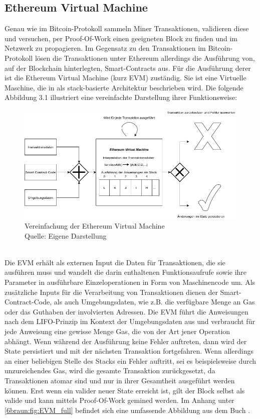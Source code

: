\subsection{Ethereum Virtual Machine}
Genau wie im Bitcoin-Protokoll sammeln Miner Transaktionen, validieren diese und versuchen, per Proof-Of-Work einen geeigneten Block zu finden und im Netzwerk zu propagieren. 
Im Gegensatz zu den Transaktionen im Bitcoin-Protokoll lösen die Transaktionen unter Ethereum allerdings die Ausführung von, auf der Blockchain hinterlegten, Smart-Contracts aus. 
Für die Ausführung derer ist die Ethereum Virtual Machine (kurz EVM) zuständig. 
Sie ist eine Virtuelle Maschine, die in  \cite{wood_yellowpaper_2014} als stack-basierte Architektur beschrieben wird. 
Die folgende Abbildung 3.1 illustriert eine vereinfachte Darstellung ihrer Funktionsweise: 
\begin{figure}[htpb]
	\centering
	\includegraphics[width=\textwidth]{images/evm_simple.png}
	\caption{Vereinfachung der Ethereum Virtual Machine\\
	Quelle: Eigene Darstellung}
	\label{6braun:fig:evm_simple}
\end{figure}\\

Die EVM erhält als externen Input die Daten für Transaktionen, die sie ausführen muss und wandelt die darin enthaltenen Funktionsaufrufe sowie ihre Parameter in ausführbare Einzeloperationen in Form von Maschinencode um. 
Als zusätzliche Inputs für die Verarbeitung von Transaktionen dienen der Smart-Contract-Code, als auch Umgebungsdaten, wie z.B. die verfügbare Menge an Gas oder das Guthaben der involvierten Adressen. 
Die EVM führt die Anweisungen nach dem LIFO-Prinzip im Kontext der Umgebungsdaten aus und verbraucht für jede Anweisung eine gewisse Menge Gas, die von der Art jener Operation abhängt. Wenn während der Ausführung keine Fehler auftreten, dann wird der State persistiert und mit der nächsten Transaktion fortgefahren. 
Wenn allerdings an einer beliebigen Stelle des Stacks ein Fehler auftritt, sei es beispielsweise durch unzureichendes Gas, wird die gesamte Transaktion zurückgesetzt, da Transaktionen atomar sind und nur in ihrer Gesamtheit ausgeführt werden können. Erst wenn ein valider neuer State erreicht ist, gilt der Block selbst als valide und kann mittels Proof-Of-Work gemined werden. Im Anhang unter \ref{6braun:fig:EVM_full} befindet sich eine umfassende Abbildung aus dem Buch \cite{antanopoulos_2018}.
